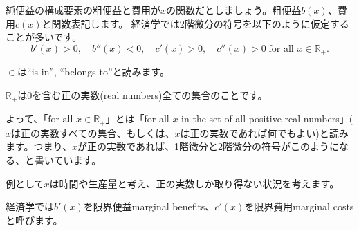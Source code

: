 \begin{frame}{}
純便益の構成要素の粗便益と費用が$x$の関数だとしましょう。粗便益$b(x)$、費用$c(x)$と関数表記します。
\pause 
経済学では2階微分の符号を以下のように仮定することが多いです。
\[
b'(x) > 0, \quad b''(x)<0, \quad c'(x)>0, \quad c''(x)>0 \; \mbox{for all }x\in\mathbb R_{+}.
\]
\begin{dinglist}{43}
\vspace{1.0ex}\setlength{\itemsep}{1.0ex}\setlength{\baselineskip}{12pt}
\pause 
\item	$\in$は``is in'', ``belongs to''と読みます。
\pause 
\item	$\mathbb R_{+}$は0を含む正の実数(real numbers)全ての集合のことです。\\[2ex]
\end{dinglist}
\pause 
よって、「$\mbox{for all }x\in\mathbb R_{+}$」とは「for all $x$ in the set of all positive real numbers」($x$は正の実数すべての集合、もしくは、$x$は正の実数であれば何でもよい)と読みます。\pause つまり、$x$が正の実数であれば、1階微分と2階微分の符号がこのようになる、と書いています。
\begin{dinglist}{43}
\vspace{1.0ex}\setlength{\itemsep}{1.0ex}\setlength{\baselineskip}{12pt}
\pause 
\item	例として$x$は時間や生産量と考え、正の実数しか取り得ない状況を考えます。
\end{dinglist}

\vspace{2ex}
\pause 
経済学では$b'(x)$を限界便益marginal benefits、$c'(x)$を限界費用marginal costsと呼びます。
\end{frame}

